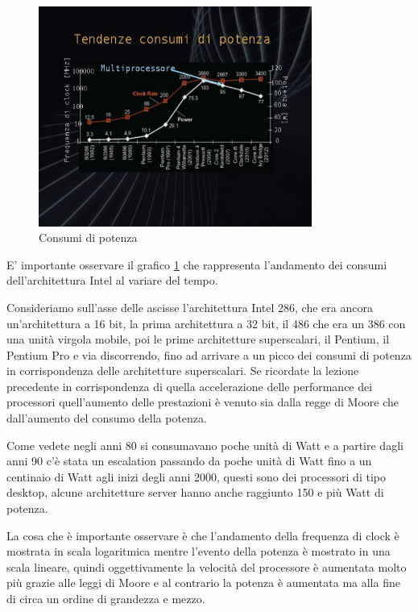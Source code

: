\FloatBarrier
\begin{figure}[H]
  \centering
  \includegraphics[width=0.8\textwidth,
                    trim=50 110 45 100, %
                    clip]
                    {images/Lez02_p01_fig_04.png}
  \caption{Consumi di potenza
  \label{fig:Lez02_p01_fig_04}}
\end{figure}
\FloatBarrier
\noindent

E' importante osservare il grafico \ref{fig:Lez02_p01_fig_04} che rappresenta l'andamento dei consumi dell'architettura Intel al variare del tempo.

Consideriamo sull'asse delle ascisse l'architettura Intel 286, che era ancora un'architettura a 16 bit, la prima architettura a 32 bit, il 486 che era un 386 con una unità virgola mobile, poi le prime architetture superscalari, il Pentium, il Pentium Pro e via discorrendo, fino ad arrivare a un picco dei consumi di potenza in corrispondenza delle architetture superscalari. Se ricordate la lezione precedente in corrispondenza di quella accelerazione delle performance dei processori quell'aumento delle prestazioni è venuto sia dalla regge di Moore che dall'aumento del consumo della potenza.

Come vedete negli anni 80 si consumavano poche unità di Watt e a partire dagli anni 90 c'è stata un escalation passando da poche unità di Watt fino a un centinaio di Watt agli inizi degli anni 2000, questi sono dei processori di tipo desktop, alcune architetture server hanno anche raggiunto 150 e più Watt di potenza.

La cosa che è importante osservare è che l'andamento della frequenza di clock è mostrata in scala logaritmica mentre l'evento della potenza è mostrato in una scala lineare, quindi oggettivamente la velocità del processore è aumentata molto più grazie alle leggi di Moore e al contrario la potenza è aumentata ma alla fine di circa un ordine di grandezza e mezzo.

